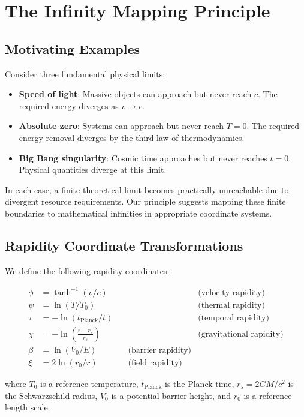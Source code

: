 \documentclass[12pt,a4paper]{article}
\begin{document}
\section{The Infinity Mapping Principle}

\subsection{Motivating Examples}

Consider three fundamental physical limits:
\begin{itemize}
    \item \textbf{Speed of light}: Massive objects can approach but never reach $c$. The required energy diverges as $v \to c$.
    \item \textbf{Absolute zero}: Systems can approach but never reach $T = 0$. The required energy removal diverges by the third law of thermodynamics.
    \item \textbf{Big Bang singularity}: Cosmic time approaches but never reaches $t = 0$. Physical quantities diverge at this limit.
\end{itemize}

In each case, a finite theoretical limit becomes practically unreachable due to divergent resource requirements. Our principle suggests mapping these finite boundaries to mathematical infinities in appropriate coordinate systems.

\subsection{Rapidity Coordinate Transformations}

We define the following rapidity coordinates:

\begin{align}
\phi &= \tanh^{-1}(v/c) \quad &&\text{(velocity rapidity)} \\
\psi &= \ln(T/T_0) \quad &&\text{(thermal rapidity)} \\
\tau &= -\ln(t_{\text{Planck}}/t) \quad &&\text{(temporal rapidity)} \\
\chi &= -\ln\left(\frac{r - r_s}{r_s}\right) \quad &&\text{(gravitational rapidity)} \\
\beta &= \ln(V_0/E) \quad & \text{(barrier rapidity)} \\
\xi &= 2\ln(r_0/r) \quad & \text{(field rapidity)}
\end{align}

where $T_0$ is a reference temperature, $t_{\text{Planck}}$ is the Planck time, $r_s = 2GM/c^2$ is the Schwarzschild radius, $V_0$ is a potential barrier height, and $r_0$ is a reference length scale.
\end{document}
